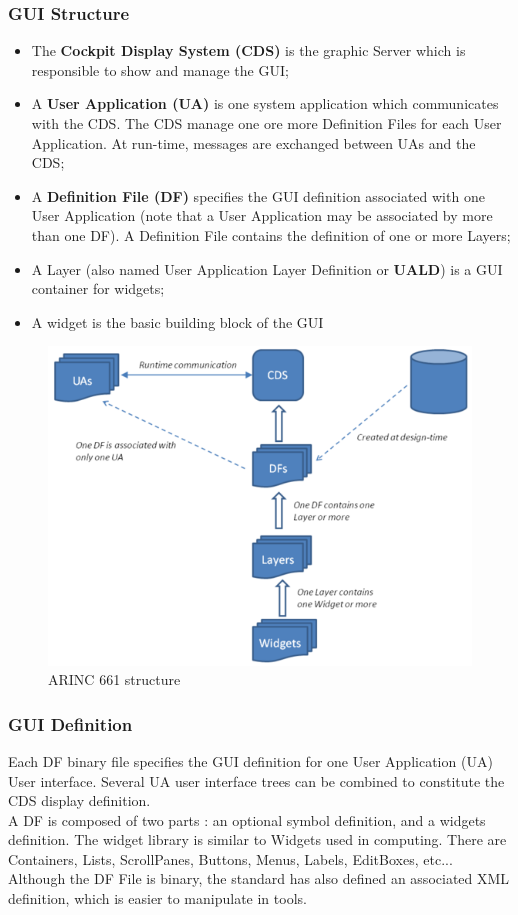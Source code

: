         \subsubsection{GUI Structure}
            \begin{itemize}
                \item The \textbf{Cockpit Display System (CDS)} is the graphic Server which is responsible to show and manage the GUI;
                \item A \textbf{User Application (UA)} is one system application which communicates with the CDS. The CDS manage one ore more 
                Definition Files for each User Application. At run-time, messages are exchanged between UAs and the CDS;
                \item A \textbf{Definition File (DF)} specifies the GUI definition associated with one User Application (note that a User 
                Application may be associated by more than one DF). A Definition File contains the definition of one or more Layers;
                \item A Layer (also named User Application Layer Definition or \textbf{UALD}) is a GUI container for widgets;
                \item A widget is the basic building block of the GUI
            \end{itemize}
            \begin{figure}[H]
                \centering
                \includegraphics[width=0.6\linewidth]{img/ARINC_661_structure.png}
                \caption{ARINC 661 structure}
            \end{figure}
        \subsubsection{GUI Definition}
            Each DF binary file specifies the GUI definition for one User Application (UA) User interface. Several UA user interface trees can 
            be combined to constitute the CDS display definition. \\
            \vspace{3mm}
            A DF is composed of two parts : an optional symbol definition, and a widgets definition. The widget library is similar to Widgets 
            used in computing. There are Containers, Lists, ScrollPanes, Buttons, Menus, Labels, EditBoxes, etc... \\
            \vspace{3mm}
            Although the DF File is binary, the standard has also defined an associated XML definition, which is easier to manipulate in tools.
